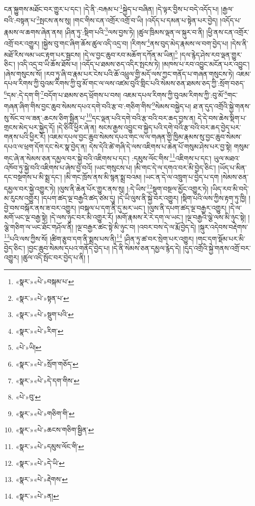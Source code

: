 ངན་སྐྱུགས་མཐོང་བར་གྱུར་པ་དང་། །དེ་ནི་:བརྐམ་པ་\footnote{«སྣར་»«པེ་»བསྐམ་པ་}སྐྱེད་པ་བཞིན། །དེ་ལྟར་བྱིས་པ་བདེ་འདོད་པ། །རྒྱལ་བའི་:བསྟན་པ་\footnote{«སྣར་»«པེ་»སྟན་པ་}སྤངས་ནས་སུ། །གང་གིས་ངན་འགྲོར་འགྲོ་བ་ཡི། །འདོད་པ་དམན་པ་སྟེན་པར་བྱེད། །འདོད་པ་རྣམས་ལ་ཆགས་ཞེན་ནས། །ཤིན་ཏུ་:སྡིག་པའི་\footnote{«སྣར་»«པེ་»སྡུག་པའི་}ལས་བྱས་ཏེ། །ཚུལ་ཁྲིམས་ལྡན་ལ་སྐུར་བ་ནི། །ཕྱི་ནས་ངན་འགྲོར་འགྲོ་བར་འགྱུར། །སྐྱེས་བུ་གང་ཞིག་ཆོས་ཚུལ་འདི་འདྲ་བ། །རིགས་\footnote{«སྣར་»«པེ་»རིག་}ནས་བུད་མེད་རྣམས་ལ་བག་བྱེད་པ། །དེས་ནི་མཐོ་རིས་ལམ་ཡང་རྟག་པར་སྦྱངས། །དེ་ལ་བྱང་ཆུབ་རབ་མཆོག་དཀོན་མ་ཡིན།\footnote{«པེ་»ཡི།} །དལ་རྙེད་ཤེས་རབ་ལྡན་གྱུར་ཅིང་། །འདི་འདྲ་བ་ཡི་ཆོས་ཐོས་པ། །འདོད་པ་ཐམས་ཅད་འདིར་སྤངས་ཏེ། །མཁས་པ་རབ་འབྱུང་མངོན་པར་འབྱུང་། །ཞེས་གསུངས་སོ། །རབ་ཏུ་ཞི་བ་རྣམ་པར་ངེས་པའི་ཆོ་འཕྲུལ་གྱི་མདོ་ལས་ཀྱང་གནོད་པ་གཞན་གསུངས་ཏེ། འཇམ་དཔལ་རིགས་ཀྱི་བུའམ་རིགས་ཀྱི་བུ་མོ་གང་ལ་ལས་འཛམ་བུའི་གླིང་པའི་སེམས་ཅན་ཐམས་ཅད་ཀྱི་:སྲོག་བཅད་\footnote{«སྣར་»«པེ་»སྲོག་གཅོད་}དམ་:དེ་དག་གི་\footnote{«སྣར་»«པེ་»དེ་དག་གིས་}བདོག་པ་ཐམས་ཅད་ཕྲོགས་པ་བས། འཇམ་དཔལ་རིགས་ཀྱི་བུའམ་རིགས་ཀྱི་:བུ་མོ་\footnote{«པེ་»བུ་}གང་གཞན་ཞིག་གིས་བྱང་ཆུབ་སེམས་དཔའ་དགེ་བའི་རྩ་བ་:གཅིག་གིས་\footnote{«སྣར་»«པེ་»གཅིག་གི་}སེམས་བསྐྱེད་པ། ཐ་ན་དུད་འགྲོའི་སྐྱེ་གནས་སུ་སོང་བ་ལ་ཟན་:ཆངས་ཅིག་སྦྱིན་པ་\footnote{«སྣར་»«པེ་»ཆངས་གཅིག་སྦྱིན་}དང་ལྡན་པའི་དགེ་བའི་རྩ་བའི་བར་ཆད་བྱས་ན། དེ་དེ་བས་ཆེས་སྡིག་པ་གྲངས་མེད་པར་སྐྱེད་དོ། །དེ་ཅིའི་ཕྱིར་ཞེ་ན། སངས་རྒྱས་འབྱུང་བ་སྐྱེད་པའི་དགེ་བའི་རྩ་བའི་བར་ཆད་བྱེད་པར་གནས་པའི་ཕྱིར་རོ། །འཇམ་དཔལ་བྱང་ཆུབ་སེམས་དཔའ་གང་ལ་ལ་གཞན་གྱི་ཁྱིམ་རྣམས་སུ་བྱང་ཆུབ་སེམས་དཔའ་ལ་ཕྲག་དོག་དང་སེར་སྣ་བྱེད་ན། དེས་དེའི་ཚེ་གཞི་དེ་ལས་འཇིགས་པ་ཆེན་པོ་གསུམ་ཤེས་པར་བྱ་སྟེ། གསུམ་གང་ཞེ་ན་སེམས་ཅན་དམྱལ་བར་སྐྱེ་བའི་འཇིགས་པ་དང་། :དམུས་ལོང་གིས་\footnote{«སྣར་»«པེ་»དམུས་ལོང་གི་}འཇིགས་པ་དང་། ཡུལ་མཐའ་འཁོབ་ཏུ་སྐྱེ་བའི་འཇིགས་པ་ཞེས་བྱ་བའོ། །ཡང་གསུངས་པ། །མི་གང་དེ་ལ་དགའ་བར་མི་བྱེད་ཅིང་། །ཡོད་པ་མིན་དང་བསྔགས་པ་མི་སྨྲ་དང་། །མི་གང་ཁྲོས་ནས་མི་སྙན་སྨྲ་བའམ། །ཡང་ན་དེ་ལ་འཁྲུག་པ་བྱེད་པ་དག །སེམས་ཅན་དམྱལ་བར་སྐྱེ་འགྱུར་ཏེ། །ལུས་ནི་ཆེན་པོར་གྱུར་ནས་སུ། །:དེ་ཡིས་\footnote{«སྣར་»«པེ་»དེ་ཡི་}སྡུག་བསྔལ་མྱོང་འགྱུར་ཏེ། །ཡིད་རབ་མི་བདེ་མ་རུངས་འགྱུར། །དཔག་ཚད་ལྔ་བརྒྱའི་ཚད་ཙམ་དུ། །དེ་ཡི་ལུས་ནི་སྐྱེ་བར་འགྱུར། །སྡིག་པའི་ལས་ཀྱིས་རྟག་ཏུ་ཁྱི། །བྱེ་བས་བསྐོར་ནས་ཟ་བར་འགྱུར། །བསྐལ་པ་དག་ནི་དུ་མར་ཡང་། །ལུས་ནི་དཔག་ཚད་ལྔ་བརྒྱར་འགྱུར། །དེ་ལ་མགོ་ཡང་ལྔ་བརྒྱ་སྟེ། །དེ་ལས་ཉུང་བར་མི་འགྱུར་རོ། །མགོ་རྣམས་རེ་རེ་དག་ལ་ཡང་། །ལྔ་བརྒྱའི་ལྕེ་ལས་མི་ཉུང་སྟེ། །ལྕེ་གཅིག་ལ་ཡང་ཐོང་གཤོལ་ནི། །ལྔ་བརྒྱར་ཚང་སྟེ་མི་ཉུང་བ། །འབར་བས་དེ་ལ་རྨོ་བྱེད་དེ། །སྐུར་འདེབས་བརྡེགས་\footnote{«སྣར་»«པེ་»རྡེགས་}པའི་ལས་ཀྱིས་སོ། །ཚིག་རྩུབ་དག་ནི་སྨྲས་པས་ནི།\footnote{«སྣར་»«པེ་»ན།} །ཤིན་ཏུ་ཚ་བར་སྲེག་པར་འགྱུར། །གང་དག་སྡོམ་པར་མི་བྱེད་ཅིང་། །བྱང་ཆུབ་སེམས་དཔའ་གནོད་བྱེད་པ། །དེ་ནི་སེམས་ཅན་དམྱལ་རྙེད་དེ། །དུད་འགྲོའི་སྐྱེ་གནས་འགྲོ་བར་འགྱུར། །ཚུལ་འདི་སྤོང་བར་བྱེད་པ་ནི། །
